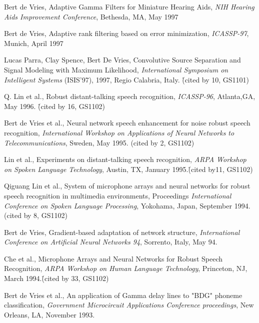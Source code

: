 \begin{etaremune}
\item Bert de Vries, Adaptive Gamma Filters for Miniature Hearing Aids, {\em NIH Hearing Aids Improvement Conference},
Bethesda, MA, May 1997

\item Bert de Vries, Adaptive rank filtering based on error minimization,
{\em ICASSP-97}, Munich, April 1997

\item Lucas Parra, Clay Spence, Bert De Vries, Convolutive Source Separation
and Signal Modeling with Maximum Likelihood, {\em International
Symposium on Intelligent Systems} (ISIS'97), 1997, Regio Calabria,
Italy. \r{(cited by 10, GS1101)}

\item Q. Lin et al., Robust distant-talking speech recognition,  {\em
ICASSP-96}, Atlanta,GA, May 1996. \r{(cited by 16, GS1102)}

\item Bert de Vries et al., Neural network speech enhancement for noise robust speech recognition,
{\em International Workshop on Applications of Neural Networks to Telecommunications}, Sweden, May
1995. (cited by 2, GS1102)

\item Lin et al., Experiments on distant-talking speech recognition, {\em ARPA Workshop on Spoken
Language Technology}, Austin, TX, January 1995.\r{(cited by11, GS1102)}

\item Qiguang Lin et al., System of microphone arrays and neural networks for robust speech recognition in multimedia
environments, Proceedings {\em International Conference on Spoken Language
Processing}, Yokohama, Japan, September 1994. (cited by 8, GS1102)

\item Bert de Vries, Gradient-based adaptation of network structure, {\em International Conference on
Artificial Neural Networks 94}, Sorrento, Italy, May 94.

\item Che et al., Microphone Arrays and Neural Networks for Robust Speech
Recognition, {\em ARPA
Workshop on Human Language Technology}, Princeton, NJ, March 1994.\r{(cited by 33, GS1102)}

\item Bert de Vries et al., An application of Gamma delay lines to "BDG" phoneme classification,
{\em Government Microcircuit Applications Conference proceedings}, New
Orleans, LA, November 1993.


\end{etaremune}
